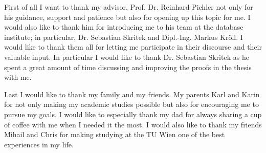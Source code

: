 \documentclass[draft,final]{vutinfth} %
\begin{document}
\frontmatter %

\addstatementpage

\begin{acknowledgements*}
	First of all I want to thank my advisor, Prof. Dr. Reinhard Pichler not only
	for his guidance, support and patience but also for opening up this topic for me.
	I would also like to thank him for introducing me to his team at the
	database institute; in particular,  Dr. Sebastian Skritek and Dipl.-Ing. Markus Kr{\"o}ll. I would like to
	thank them all for letting me participate in their discourse and their
	valuable input. In particular I would like to thank
	Dr. Sebastian Skritek as he spent a great amount of time discussing and
	improving the proofs in the thesis with me. 

	\noindent
	Last I would like to thank my family and my friends. 
	My parents Karl and Karin for not only making my academic studies possible but
	also for encouraging me to pursue my goals. I would like to especially thank my dad 
	for always sharing a cup of coffee with me when I needed it the most. 
	I would also like to thank my friends Mihail and Chris for making studying
	at the TU Wien one of the best experiences in my life. 
\end{acknowledgements*}
\end{document}

